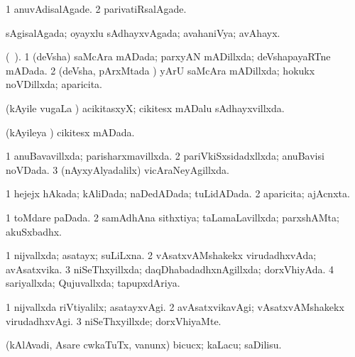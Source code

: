 {{\bentry
{} 
\gl{\kirxvi}
\expl{}
\bmng
\bnum
\num{1} anuvAdisalAgade. 
\num{2} parivatiRsalAgade. 
\enum
\emng
\eentry

\bentry
{} 
\gl{\gu}
\expl{}
\bmng
sAgisalAgada; oyayxlu sAdhayxvAgada; avahaniVya; avAhayx. 
\emng
\eentry

\bentry
{} 
\gl{\gu}
\expl{}
\bmng
(\ame\ ). 
\bnum
\num{1} (deVsha) saMcAra mADada; parxyAN mADillxda; deVshapayaRTne mADada. 
\num{2} (deVsha, pArxMtada \vi) yArU saMcAra mADillxda; hokukx noVDillxda; aparicita. 
\enum
\emng
\eentry

\bentry
{} 
\gl{\gu}
\expl{}
\bmng
 (kAyile \mo vugaLa \vi) acikitasxyX; cikitesx mADalu sAdhayxvillxda. 
\emng
\eentry

\bentry
{} 
\gl{\gu}
\expl{}
\bmng
(kAyileya \vi) cikitesx mADada. 
\emng
\eentry

\bentry
{} 
\gl{\gu}
\expl{}
\bmng
\bnum
\num{1} anuBavavillxda; parisharxmavillxda. 
\num{2} pariVkiSxsidadxllxda; anuBavisi noVDada. 
\num{3} (nAyxyAlyadalilx) vicAraNeyAgillxda. 
\enum
\emng
\eentry

\bentry
{} 
\gl{\gu}
\expl{}
\bmng
\bnum
\num{1} hejejx hAkada; kAliDada; naDedADada; tuLidADada. 
\num{2} aparicita; ajAcnxta. 
\enum
\emng
\eentry

\bentry
{} 
\gl{\gu}
\expl{}
\bmng
\bnum
\num{1} toMdare paDada. 
\num{2} samAdhAna sithxtiya; taLamaLavillxda; parxshAMta; akuSxbadhx. 
\enum
\emng
\eentry

\bentry
{} 
\gl{\gu}
\expl{}
\bmng
\bnum
\num{1} nijvallxda; asatayx; suLiLxna. 
\num{2} vAsatxvAMshakekx virudadhxvAda; avAsatxvika. 
\num{3} niSeThxyillxda; daqDhabadadhxnAgillxda; dorxVhiyAda. 
\num{4} sariyallxda; Qujuvallxda; tapupxdAriya. 
\enum
\emng
\eentry

\bentry
{} 
\gl{\kirxvi}
\bmng
\bnum
\num{1} nijvallxda riVtiyalilx; asatayxvAgi. 
\num{2} avAsatxvikavAgi; vAsatxvAMshakekx virudadhxvAgi. 
\num{3} niSeThxyillxde; dorxVhiyaMte. 
\enum
\emng
\eentry

\bentry
{} 
\gl{\sakirx}
\expl{}
\bmng
(kAlAvadi, Asare cwkaTuTx, \mo vanunx) bicucx; kaLacu; saDilisu. 
\emng
\eentry

}}
